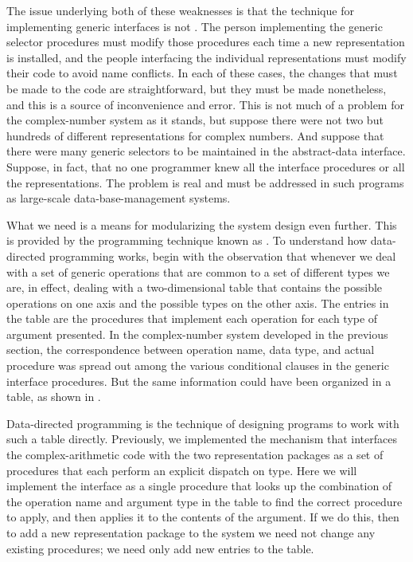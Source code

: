 The issue underlying both of these weaknesses is that the technique for
implementing generic interfaces is not .  The person
implementing the generic selector procedures must modify those procedures each
time a new representation is installed, and the people interfacing the
individual representations must modify their code to avoid name conflicts.  In
each of these cases, the changes that must be made to the code are
straightforward, but they must be made nonetheless, and this is a source of
inconvenience and error.  This is not much of a problem for the complex-number
system as it stands, but suppose there were not two but hundreds of different
representations for complex numbers.  And suppose that there were many generic
selectors to be maintained in the abstract-data interface.  Suppose, in fact,
that no one programmer knew all the interface procedures or all the
representations.  The problem is real and must be addressed in such programs as
large-scale data-base-management systems.

What we need is a means for modularizing the system design even further.  This
is provided by the programming technique known as .  To understand how data-directed programming works, begin with
the observation that whenever we deal with a set of generic operations that are
common to a set of different types we are, in effect, dealing with a
two-dimensional table that contains the possible operations on one axis and the
possible types on the other axis.  The entries in the table are the procedures
that implement each operation for each type of argument presented.  In the
complex-number system developed in the previous section, the correspondence
between operation name, data type, and actual procedure was spread out among
the various conditional clauses in the generic interface procedures.  But the
same information could have been organized in a table, as shown in .

Data-directed programming is the technique of designing programs to work with
such a table directly.  Previously, we implemented the mechanism that
interfaces the complex-arithmetic code with the two representation packages as
a set of procedures that each perform an explicit dispatch on type.  Here we
will implement the interface as a single procedure that looks up the
combination of the operation name and argument type in the table to find the
correct procedure to apply, and then applies it to the contents of the
argument.  If we do this, then to add a new representation package to the
system we need not change any existing procedures; we need only add new entries
to the table.

